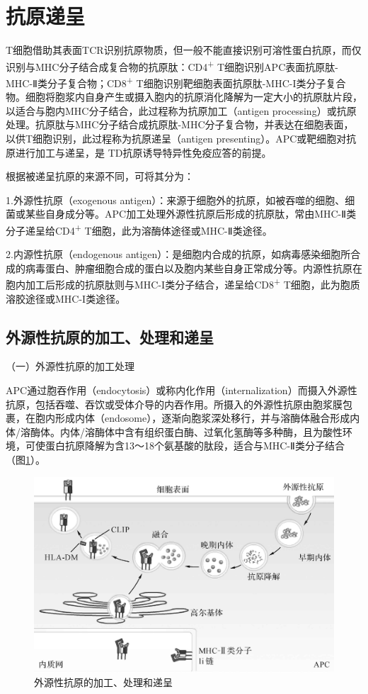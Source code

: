 \section{抗原递呈}

T细胞借助其表面TCR识别抗原物质，但一般不能直接识别可溶性蛋白抗原，而仅识别与MHC分子结合成复合物的抗原肽：CD4\textsuperscript{+}
T细胞识别APC表面抗原肽-MHC-Ⅱ类分子复合物；CD8\textsuperscript{+}
T细胞识别靶细胞表面抗原肽-MHC-I类分子复合物。细胞将胞浆内自身产生或摄入胞内的抗原消化降解为一定大小的抗原肽片段，以适合与胞内MHC分子结合，此过程称为抗原加工（antigen
processing）或抗原处理。抗原肽与MHC分子结合成抗原肽-MHC分子复合物，并表达在细胞表面，以供T细胞识别，此过程称为抗原递呈（antigen
presenting）。APC或靶细胞对抗原进行加工与递呈，是
TD抗原诱导特异性免疫应答的前提。

根据被递呈抗原的来源不同，可将其分为：

1.外源性抗原（exogenous
antigen）：来源于细胞外的抗原，如被吞噬的细胞、细菌或某些自身成分等。APC加工处理外源性抗原后形成的抗原肽，常由MHC-Ⅱ类分子递呈给CD4\textsuperscript{+}
T细胞，此为溶酶体途径或MHC-Ⅱ类途径。

2.内源性抗原（endogenous
antigen）：是细胞内合成的抗原，如病毒感染细胞所合成的病毒蛋白、肿瘤细胞合成的蛋白以及胞内某些自身正常成分等。内源性抗原在胞内加工后形成的抗原肽则与MHC-I类分子结合，递呈给CD8\textsuperscript{+}
T细胞，此为胞质溶胶途径或MHC-I类途径。


\subsection{外源性抗原的加工、处理和递呈}

（一）外源性抗原的加工处理

APC通过胞吞作用（endocytosis）或称内化作用（internalization）而摄入外源性抗原，包括吞噬、吞饮或受体介导的内吞作用。所摄入的外源性抗原由胞浆膜包裹，在胞内形成内体（endosome），逐渐向胞浆深处移行，并与溶酶体融合形成内体/溶酶体。内体/溶酶体中含有组织蛋白酶、过氧化氢酶等多种酶，且为酸性环境，可使蛋白抗原降解为含13～18个氨基酸的肽段，适合与MHC-Ⅱ类分子结合（图\ref{fig9-7}）。

\begin{figure}[!htbp]
 \centering
 \includegraphics{./images/Image00133.jpg}
 \captionsetup{justification=centering}
 \caption{外源性抗原的加工、处理和递呈}
 \label{fig9-7}
  \end{figure} 

